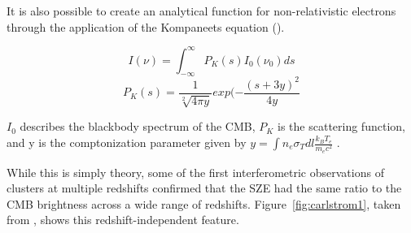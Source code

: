 \documentclass[manuscript]{aastex}
\begin{document}
It is also possible to create an analytical function for non-relativistic electrons through the application of the Kompaneets equation (\cite{Birkinshaw1999}).

\begin{equation}\label{eq:ksze1}
I(\nu) = \int_{-\infty}^{\infty} P_{K}(s) I_{0}(\nu_{0}) ds
\end{equation}
\begin{equation}\label{eq:ksze2}
P_{K}(s) = \frac{1}{\sqrt[2]{4 \pi y}} exp(-\frac{(s + 3y)^{2}}{4y}
\end{equation}

\(I_{0}\) describes the blackbody spectrum of the CMB, \(P_{K}\) is the scattering function, and y is the comptonization parameter given by \(y = \int   n_{e}   \sigma_{T}   dl   \frac{k_{B}T_{e}}{m_{e}c^{2}}\) .

While this is simply theory, some of the first interferometric observations of clusters at multiple redshifts confirmed that the SZE had the same ratio to the CMB brightness across a wide range of redshifts. Figure~\ref{fig:carlstrom1}, taken from \cite{Carlstrom2002}, shows this redshift-independent feature.
\end{document}
